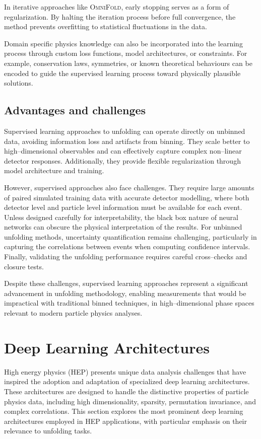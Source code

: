         In iterative approaches like \textsc{OmniFold}, early stopping serves as a form of regularization.
        By halting the iteration process before full convergence, the method prevents overfitting to statistical fluctuations in the data.

        Domain specific physics knowledge can also be incorporated into the learning process through custom loss functions, model architectures, or constraints.
        For example, conservation laws, symmetries, or known theoretical behaviours can be encoded to guide the supervised learning process toward physically plausible solutions.
    \subsection{Advantages and challenges}
        Supervised learning approaches to unfolding can operate directly on unbinned data, avoiding information loss and artifacts from binning.
        They scale better to high--dimensional observables and can effectively capture complex non--linear detector responses.
        Additionally, they provide flexible regularization through model architecture and training.

        However, supervised approaches also face challenges.
        They require large amounts of paired simulated training data with accurate detector modelling, where both detector level and particle level information must be available for each event.
        Unless designed carefully for interpretability, the black box nature of neural networks can obscure the physical interpretation of the results.
        For unbinned unfolding methods, uncertainty quantification remains challenging, particularly in capturing the correlations between events when computing confidence intervals.
        Finally, validating the unfolding performance requires careful cross--checks and closure tests.

        Despite these challenges, supervised learning approaches represent a significant advancement in unfolding methodology, enabling measurements that would be impractical with traditional binned techniques,  in high--dimensional phase spaces relevant to modern particle physics analyses.



\section{Deep Learning Architectures}
High energy physics (HEP) presents unique data analysis challenges that have inspired the adoption and adaptation of specialized deep learning architectures.
%
These architectures are designed to handle the distinctive properties of particle physics data, including high dimensionality, sparsity, permutation invariance, and complex correlations.
%
This section explores the most prominent deep learning architectures employed in HEP applications, with particular emphasis on their relevance to unfolding tasks.
